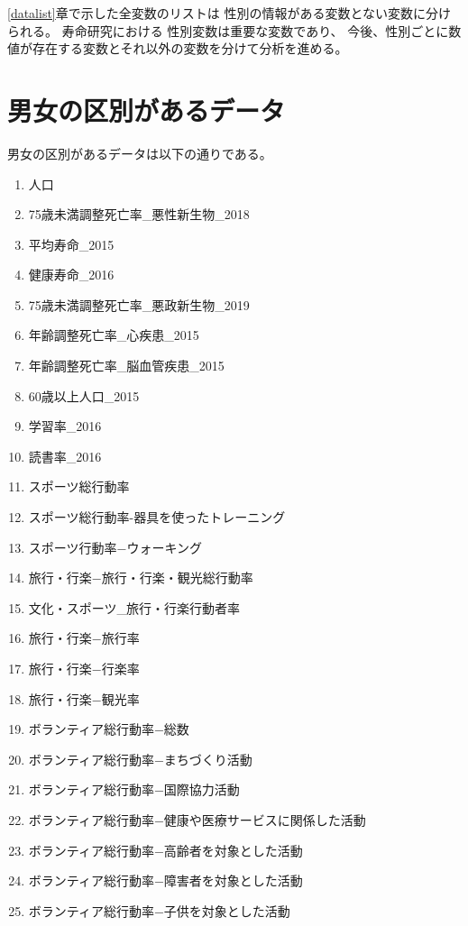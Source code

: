 \ref{datalist}章で示した全変数のリストは
性別の情報がある変数とない変数に分けられる。
寿命研究における
性別変数は重要な変数であり、
今後、性別ごとに数値が存在する変数とそれ以外の変数を分けて分析を進める。

\section{男女の区別があるデータ}

男女の区別があるデータは以下の通りである。

\begin{multicols}{2}

\begin{enumerate}
  \item 人口
  \item 75歳未満調整死亡率\_悪性新生物\_2018
  \item 平均寿命\_2015
  \item 健康寿命\_2016
  \item 75歳未満調整死亡率\_悪政新生物\_2019
  \item 年齢調整死亡率\_心疾患\_2015
  \item 年齢調整死亡率\_脳血管疾患\_2015
  \item 60歳以上人口\_2015
  \item 学習率\_2016
  \item 読書率\_2016
  \item スポーツ総行動率
  \item スポーツ総行動率-器具を使ったトレーニング
  \item スポーツ行動率−ウォーキング
  \item 旅行・行楽−旅行・行楽・観光総行動率
  \item 文化・スポーツ\_旅行・行楽行動者率
  \item 旅行・行楽−旅行率
  \item 旅行・行楽−行楽率
  \item 旅行・行楽−観光率
  \item ボランティア総行動率−総数
  \item ボランティア総行動率−まちづくり活動
  \item ボランティア総行動率−国際協力活動
  \item ボランティア総行動率−健康や医療サービスに関係した活動
  \item ボランティア総行動率−高齢者を対象とした活動
  \item ボランティア総行動率−障害者を対象とした活動
  \item ボランティア総行動率−子供を対象とした活動

\end{enumerate}
\end{multicols}
